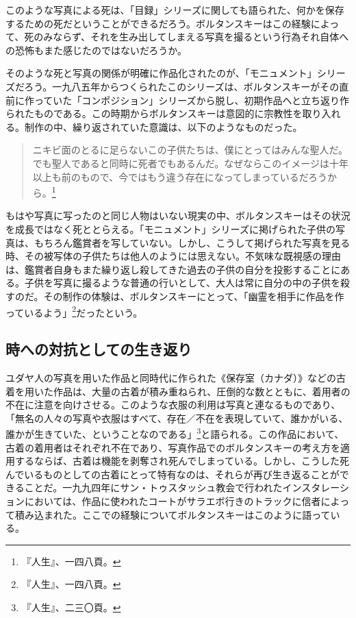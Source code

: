 \documentclass[b5j,twoside,twocolumn]{utarticle}
\begin{document}
このような写真による死は、「目録」シリーズに関しても語られた、何かを保存するための死だということができるだろう。ボルタンスキーはこの経験によって、死のみならず、それを生み出してしまえる写真を撮るという行為それ自体への恐怖もまた感じたのではないだろうか。


そのような死と写真の関係が明確に作品化されたのが、「モニュメント」シリーズだろう。一九八五年からつくられたこのシリーズは、ボルタンスキーがその直前に作っていた「コンポジション」シリーズから脱し、初期作品へと立ち返り作られたものである。この時期からボルタンスキーは意図的に宗教性を取り入れる。制作の中、繰り返されていた意識は、以下のようなものだった。
\begin{quote}
ニキビ面のとるに足らないこの子供たちは、僕にとってはみんな聖人だ。でも聖人であると同時に死者でもあるんだ。なぜならこのイメージは十年以上も前のもので、今ではもう違う存在になってしまっているだろうから。\footnote{『人生』、一四八頁。}
\end{quote}


もはや写真に写ったのと同じ人物はいない現実の中、ボルタンスキーはその状況を成長ではなく死ととらえる。「モニュメント」シリーズに掲げられた子供の写真は、もちろん鑑賞者を写していない。しかし、こうして掲げられた写真を見る時、その被写体の子供たちは他人のようには思えない。不気味な既視感の理由は、鑑賞者自身もまた繰り返し殺してきた過去の子供の自分を投影することにある。子供を写真に撮るような普通の行いとして、大人は常に自分の中の子供を殺すのだ。その制作の体験は、ボルタンスキーにとって、「幽霊を相手に作品を作っているよう」\footnote{『人生』、一四八頁。}だったという。

\subsection{時への対抗としての生き返り}
ユダヤ人の写真を用いた作品と同時代に作られた《保存室（カナダ）》などの古着を用いた作品は、大量の古着が積み重ねられ、圧倒的な数とともに、着用者の不在に注意を向けさせる。このような衣服の利用は写真と連なるものであり、「無名の人々の写真や衣服はすべて、存在／不在を表現していて、誰かがいる、誰かが生きていた、ということなのである」\footnote{『人生』、二三〇頁。}と語られる。この作品において、古着の着用者はそれぞれ不在であり、写真作品でのボルタンスキーの考え方を適用するならば、古着は機能を剥奪され死んでしまっている。しかし、こうした死んでいるものとしての古着にとって特有なのは、それらが再び生き返ることができることだ。一九九四年にサン・トゥスタッシュ教会で行われたインスタレーションにおいては、作品に使われたコートがサラエボ行きのトラックに信者によって積み込まれた。ここでの経験についてボルタンスキーはこのように語っている。
\end{document}

